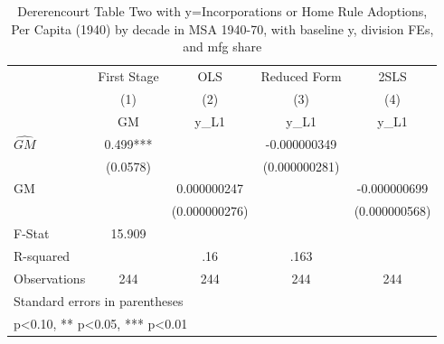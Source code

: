 \begin{table}[htbp]\centering
\def\sym#1{\ifmmode^{#1}\else\(^{#1}\)\fi}
\caption{Dererencourt Table Two with y=Incorporations or Home Rule Adoptions, Per Capita (1940) by decade in MSA 1940-70, with baseline y, division FEs, and mfg share}
\begin{tabular}{l*{4}{c}}
\toprule
                    & First Stage   &         OLS   &Reduced Form   &        2SLS   \\
                    &\multicolumn{1}{c}{(1)}&\multicolumn{1}{c}{(2)}&\multicolumn{1}{c}{(3)}&\multicolumn{1}{c}{(4)}\\
                    &\multicolumn{1}{c}{GM}&\multicolumn{1}{c}{y\_L1}&\multicolumn{1}{c}{y\_L1}&\multicolumn{1}{c}{y\_L1}\\
\midrule
$\hat{GM}$          &       0.499***&               &-0.000000349   &               \\
                    &    (0.0578)   &               &(0.000000281)   &               \\
\addlinespace
GM                  &               & 0.000000247   &               &-0.000000699   \\
                    &               &(0.000000276)   &               &(0.000000568)   \\
\midrule
F-Stat              &      15.909   &               &               &               \\
R-squared           &               &         .16   &        .163   &               \\
Observations        &         244   &         244   &         244   &         244   \\
\bottomrule
\multicolumn{5}{l}{\footnotesize Standard errors in parentheses}\\
\multicolumn{5}{l}{\footnotesize * p<0.10, ** p<0.05, *** p<0.01}\\
\end{tabular}
\end{table}

